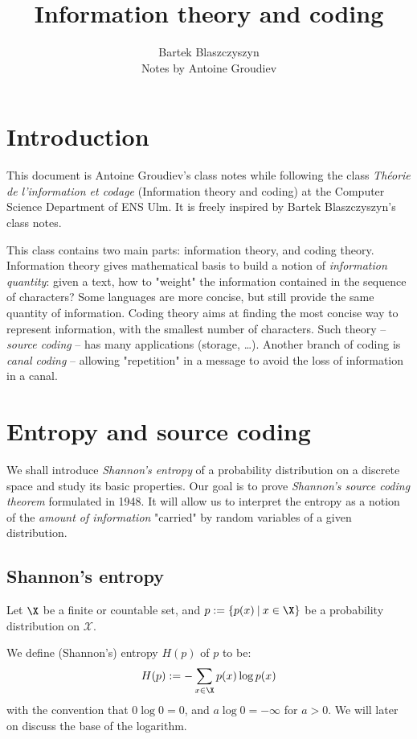 \documentclass[toc]{../cs-classes/cs-classes}
\title{Information theory and coding}
\author{Bartek Blaszczyszyn\\ Notes by Antoine Groudiev}
\begin{document}
\section*{Introduction}
This document is Antoine Groudiev's class notes while following the class \emph{Théorie de l'information et codage} (Information theory and coding) at the Computer Science Department of ENS Ulm. It is freely inspired by Bartek Blaszczyszyn's class notes. 

This class contains two main parts: information theory, and coding theory. Information theory gives mathematical basis to build a notion of \emph{information quantity}: given a text, how to "weight" the information contained in the sequence of characters? Some languages are more concise, but still provide the same quantity of information. Coding theory aims at finding the most concise way to represent information, with the smallest number of characters. Such theory -- \emph{source coding} -- has many applications (storage, \dots). Another branch of coding is \emph{canal coding} -- allowing "repetition" in a message to avoid the loss of information in a canal.

\section{Entropy and source coding}
We shall introduce \emph{Shannon’s entropy} of a probability distribution on a discrete space and study its basic properties. Our goal is to prove \emph{Shannon’s source coding theorem} formulated in 1948. It will allow us to interpret the entropy as a notion of the \emph{amount of information} "carried" by random variables of a given distribution.

\subsection{Shannon's entropy}
Let $\X$ be a finite or countable set, and $p := \{p(x) \: | \: x\in \X \}$ be a probability distribution on $\mathcal{X}$.

\begin{definition} We define (Shannon's) entropy $H(p)$ of $p$ to be:
\begin{equation}
    H(p) := -\sum_{x\in\X}p(x)\log p(x)
\end{equation}
with the convention that $0\log 0 = 0$, and $a\log 0 = -\infty$ for $a>0$.
We will later on discuss the base of the logarithm.
\end{definition}
\end{document}
